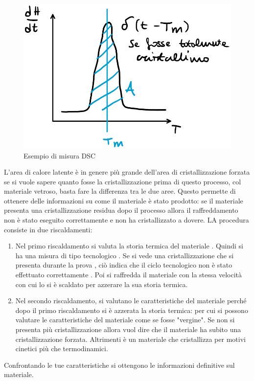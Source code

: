 \begin{figure}
\centering
\includegraphics[width = \textwidth]{gfx/DSC}
\caption{Esempio di misura DSC}
\label{fig:DSC}
\end{figure}

L'area di calore latente è in genere più grande dell'area di cristallizzazione forzata se si vuole sapere quanto fosse la cristallizzazione prima di questo processo, col materiale vetroso, basta fare la differenza tra le due aree.
Questo permette di ottenere delle informazioni su come il materiale è stato prodotto: se il materiale presenta una cristallizzazione residua dopo il processo allora il raffreddamento non è stato eseguito correttamente e non ha cristallizzato a dovere.
LA procedura consiste in due riscaldamenti:
\begin{enumerate}
\item Nel primo riscaldamento si valuta la storia termica del materiale . Quindi si ha una misura di tipo tecnologico . Se si vede una cristallizzazione che si presenta durante la prova , ciò indica che il ciclo tecnologico non è stato effettuato correttamente . Poi si raffredda il materiale con la stessa velocità con cui lo si è scaldato per azzerare la sua storia termica.
\item Nel secondo riscaldamento, si valutano le caratteristiche del materiale perché dopo il primo riscaldamento si è azzerata la storia termica: per cui si possono valutare le caratteristiche del materiale come se fosse "vergine". Se non si presenta più cristallizzazione allora vuol dire che il materiale ha subito una cristallizzazione forzata. Altrimenti è un materiale che cristallizza per motivi cinetici più che termodinamici.
\end{enumerate}
Confrontando le tue caratteristiche si ottengono le informazioni definitive sul materiale.

